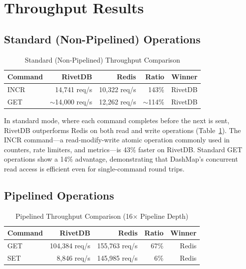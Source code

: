 \documentclass[12pt,a4paper]{report}
\begin{document}
\section{Throughput Results}

\subsection{Standard (Non-Pipelined) Operations}

\begin{table}[htbp]
\caption{Standard (Non-Pipelined) Throughput Comparison}
\label{tab:standard}
\centering
\begin{tabular}{@{}lrrrr@{}}
\toprule
\textbf{Command} & \textbf{RivetDB} & \textbf{Redis} & \textbf{Ratio} & \textbf{Winner} \\
\midrule
INCR & 14,741 req/s & 10,322 req/s & 143\% & RivetDB \\
GET & $\sim$14,000 req/s & 12,262 req/s & $\sim$114\% & RivetDB \\
\bottomrule
\end{tabular}
\end{table}

In standard mode, where each command completes before the next is sent, RivetDB outperforms Redis on both read and write operations (Table~\ref{tab:standard}). The INCR command---a read-modify-write atomic operation commonly used in counters, rate limiters, and metrics---is 43\% faster on RivetDB. Standard GET operations show a 14\% advantage, demonstrating that DashMap's concurrent read access is efficient even for single-command round trips.

\subsection{Pipelined Operations}

\begin{table}[htbp]
\caption{Pipelined Throughput Comparison (16$\times$ Pipeline Depth)}
\label{tab:pipelined}
\centering
\begin{tabular}{@{}lrrrr@{}}
\toprule
\textbf{Command} & \textbf{RivetDB} & \textbf{Redis} & \textbf{Ratio} & \textbf{Winner} \\
\midrule
GET & 104,384 req/s & 155,763 req/s & 67\% & Redis \\
SET & 8,846 req/s & 145,985 req/s & 6\% & Redis \\
\bottomrule
\end{tabular}
\end{table}
\end{document}
